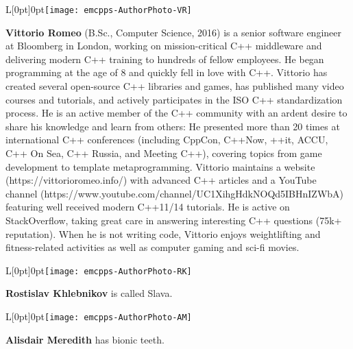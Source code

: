 \vspace*{18pt} %
\begin{wrapfigure}[11]{L}[0pt]{0pt}\texttt{[image: emcpps-AuthorPhoto-VR]}\end{wrapfigure}\noindent \textbf{Vittorio Romeo}  (B.Sc., Computer Science, 2016) is a senior software engineer at Bloomberg in London, working on mission-critical C++ middleware and delivering modern C++ training to hundreds of fellow employees. He began programming at the age of 8 and quickly fell in love with C++. Vittorio has created several open-source C++ libraries and games, has published many video courses and tutorials, and actively participates in the ISO C++ standardization process. He is an active member of the C++ community with an ardent desire to share his knowledge and learn from others: He presented more than 20 times at international C++ conferences (including CppCon, C++Now, ++it, ACCU, C++ On Sea, C++ Russia, and Meeting C++), covering topics from game development to template metaprogramming. Vittorio maintains a website (https://vittorioromeo.info/) with advanced C++ articles and a YouTube channel (https://www.youtube.com/channel/UC1XihgHdkNOQd5IBHnIZWbA) featuring well received modern C++11/14 tutorials. He is active on StackOverflow, taking great care in answering interesting C++ questions (75k+ reputation). When he is not writing code, Vittorio enjoys weightlifting and fitness-related activities as well as computer gaming and sci-fi movies.

\vspace*{18pt} %
\begin{wrapfigure}[11]{L}[0pt]{0pt}\texttt{[image: emcpps-AuthorPhoto-RK]}\end{wrapfigure}\noindent \textbf{Rostislav Khlebnikov} is called Slava.

\vspace*{18pt} %
\begin{wrapfigure}[11]{L}[0pt]{0pt}\texttt{[image: emcpps-AuthorPhoto-AM]}\end{wrapfigure}\noindent \textbf{Alisdair Meredith} has bionic teeth.
